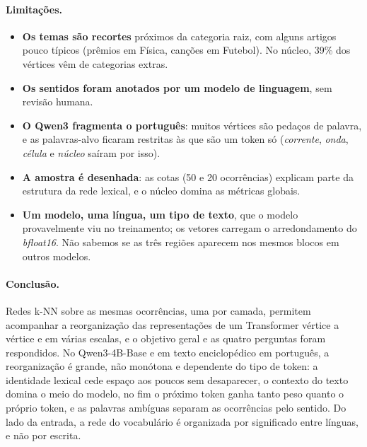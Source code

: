 \paragraph{Limitações.}
\begin{itemize}
    \item \textbf{Os temas são recortes} próximos da categoria raiz, com alguns artigos pouco
    típicos (prêmios em Física, canções em Futebol). No núcleo, 39\% dos vértices vêm de
    categorias extras.
    \item \textbf{Os sentidos foram anotados por um modelo de linguagem}, sem revisão humana.
    \item \textbf{O Qwen3 fragmenta o português}: muitos vértices são pedaços de palavra, e as
    palavras-alvo ficaram restritas às que são um token só (\emph{corrente}, \emph{onda},
    \emph{célula} e \emph{núcleo} saíram por isso).
    \item \textbf{A amostra é desenhada}: as cotas (50 e 20 ocorrências) explicam parte da
    estrutura da rede lexical, e o núcleo
    domina as métricas globais.
    \item \textbf{Um modelo, uma língua, um tipo de texto}, que o modelo provavelmente viu no
    treinamento; os vetores carregam o arredondamento do \emph{bfloat16}. Não sabemos se as
    três regiões aparecem nos mesmos blocos em outros modelos.
\end{itemize}

\paragraph{Conclusão.} Redes k-NN sobre as mesmas ocorrências, uma por camada, permitem
acompanhar a reorganização das representações de um Transformer vértice a vértice e em várias
escalas, e o objetivo geral e as quatro perguntas foram respondidos. No Qwen3-4B-Base e em
texto enciclopédico em português, a reorganização é grande, não monótona e dependente do tipo
de token: a identidade lexical cede espaço aos poucos sem desaparecer, o contexto do texto
domina o meio do modelo, no fim o próximo token ganha tanto peso quanto o próprio token, e as palavras ambíguas separam as
ocorrências pelo sentido. Do lado da entrada, a rede do vocabulário é organizada por significado
entre línguas, e não por escrita.
